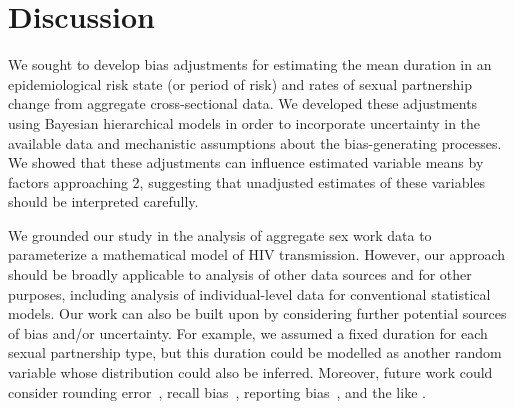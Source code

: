 \section{Discussion}
We sought to develop bias adjustments for estimating
the mean duration in an epidemiological risk state (or period of risk)
and rates of sexual partnership change
from aggregate cross-sectional data.
We developed these adjustments using Bayesian hierarchical models in order to incorporate
uncertainty in the available data and mechanistic assumptions about the bias-generating processes.
We showed that these adjustments can influence estimated variable means by factors approaching 2,
suggesting that unadjusted estimates of these variables should be interpreted carefully.
\par
We grounded our study in the analysis of aggregate sex work data
to parameterize a mathematical model of HIV transmission.
However, our approach should be broadly applicable to
analysis of other data sources and for other purposes,
including analysis of individual-level data for conventional statistical models.
Our work can also be built upon by considering
further potential sources of bias and/or uncertainty.
For example, we assumed a fixed duration for each sexual partnership type,
but this duration could be modelled as another random variable
whose distribution could also be inferred.
Moreover, future work could consider
rounding error~\cite{Mills2014},
recall bias~\cite{Ramjee1999},
reporting bias~\cite{Lowndes2012},
and the like \cite{Fenton2001}.
